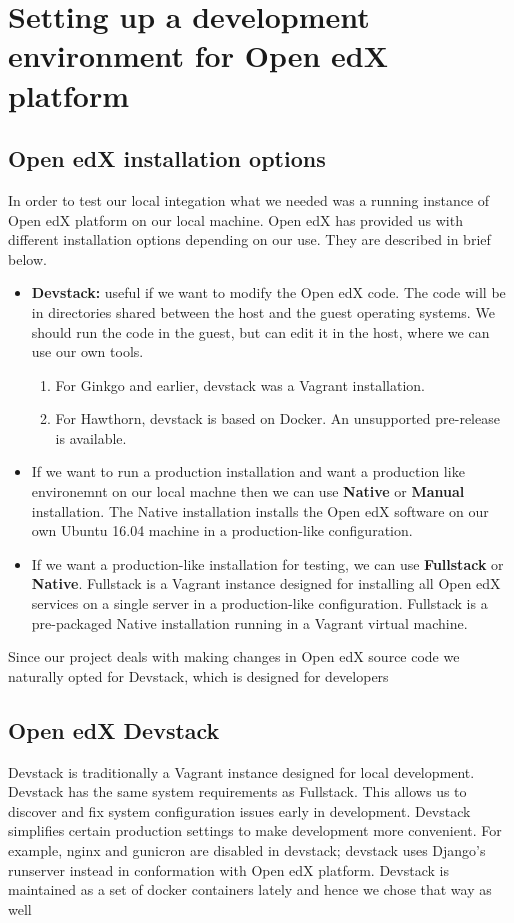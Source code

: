 \chapter{Setting up a development environment for Open edX platform}

\section{Open edX installation options}
In order to test our local integation what we needed was a running instance of Open edX platform
on our local machine. Open edX has provided us with different installation options depending on
our use. They are described in brief below.
\begin{itemize}
	\item \textbf{Devstack:} useful if we want to modify the Open edX code. The code will be in directories
shared between the host and the guest operating systems. We should run the code in the
guest, but can edit it in the host, where we can use our own tools.
		\begin{enumerate}
		\item For Ginkgo and earlier, devstack was a Vagrant installation.
		\item For Hawthorn, devstack is based on Docker. An unsupported pre-release is
available.
		\end{enumerate}
	\item If we want to run a production installation and want a production like environemnt on our
local machne then we can use \textbf{Native} or \textbf{Manual} installation. The Native installation installs
the Open edX software on our own Ubuntu 16.04 machine in a production-like
configuration.
	\item If we want a production-like installation for testing, we can use \textbf{Fullstack} or \textbf{Native}.
Fullstack is a Vagrant instance designed for installing all Open edX services on a single
server in a production-like configuration. Fullstack is a pre-packaged Native installation
running in a Vagrant virtual machine.
\end{itemize}
Since our project deals with making changes in Open edX source code we naturally opted for Devstack, which is designed for developers

\section{Open edX Devstack}
Devstack is traditionally a Vagrant instance designed for local development. Devstack has the same system
requirements as Fullstack. This allows us to discover and fix system configuration issues early in
development. Devstack simplifies certain production settings to make development more
convenient. For example, nginx and gunicron are disabled in devstack; devstack uses Django’s
runserver instead in conformation with Open edX platform.\newline
Devstack is maintained as a set of docker containers lately and hence we chose that way as well

